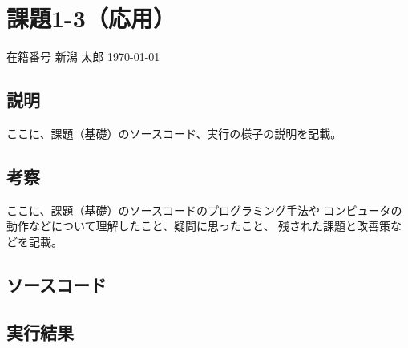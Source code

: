 \documentclass[a4paper,12pt,uplatex]{jsarticle}
\newcommand{\mynumber}{在籍番号} %
\newcommand{\myname}{新潟 太郎} %
\newcommand{\myheader}{ %

\begin{flushright}
\mynumber\hspace{1zw} \myname\hspace{1zw} \today\end{flushright}}
\begin{document}

\newpage

\section*{課題1-3（応用）}

\myheader

\subsection*{説明}

ここに、課題（基礎）のソースコード、実行の様子の説明を記載。

\subsection*{考察}

ここに、課題（基礎）のソースコードのプログラミング手法や
コンピュータの動作などについて理解したこと、疑問に思ったこと、
残された課題と改善策などを記載。

\subsection*{ソースコード}

%

\subsection*{実行結果}

%

\end{document}
